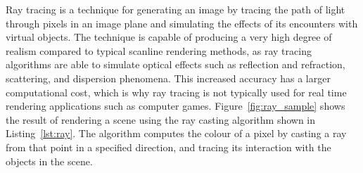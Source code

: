 Ray tracing is a technique for generating an image by tracing the path of light
through pixels in an image plane and simulating the effects of its encounters
with virtual objects. The technique is capable of producing a very high degree
of realism compared to typical scanline rendering methods, as ray tracing
algorithms are able to simulate optical effects such as reflection and
refraction, scattering, and dispersion phenomena. This increased accuracy has a
larger computational cost, which is why ray tracing is not typically used for
real time rendering applications such as computer games.
Figure~\ref{fig:ray_sample} shows the result of rendering a scene using the ray
casting algorithm shown in Listing~\ref{lst:ray}. The algorithm computes the
colour of a pixel by casting a ray from that point in a specified direction, and
tracing its interaction with the objects in the scene.


